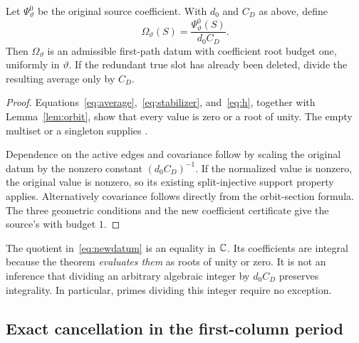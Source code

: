 \begin{theorem}\label{thm:normalized}
Let $\Psi^0_\vartheta$ be the original source coefficient. With $d_0$ and $C_D$ as above, define
\begin{equation}\label{eq:newdatum}
 \Omega_\vartheta(S)=\frac{\Psi^0_\vartheta(S)}{d_0C_D}.
\end{equation}
Then $\Omega_\vartheta$ is an admissible first-path datum with coefficient root budget one, uniformly in $\vartheta$. If the redundant true slot has already been deleted, divide the resulting average only by $C_D$.
\end{theorem}
\begin{proof}
Equations~\eqref{eq:average},~\eqref{eq:stabilizer}, and~\eqref{eq:h}, together with Lemma~\ref{lem:orbit}, show that every value is zero or a root of unity. The empty multiset or a singleton supplies .

Dependence on the active edges and covariance follow by scaling the original datum by the nonzero constant $(d_0C_D)^{-1}$. If the normalized value is nonzero, the original value is nonzero, so its existing split-injective support property applies. Alternatively covariance follows directly from the orbit-section formula. The three geometric conditions and the new coefficient certificate give the source's  with budget $1$.
\end{proof}

The quotient in~\eqref{eq:newdatum} is an equality in $\mathbb C$. Its coefficients are integral because the theorem \emph{evaluates them} as roots of unity or zero. It is not an inference that dividing an arbitrary algebraic integer by $d_0C_D$ preserves integrality. In particular, primes dividing this integer require no exception.

\subsection{Exact cancellation in the first-column period}


